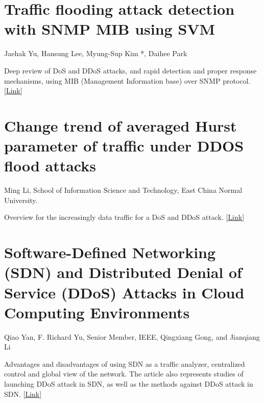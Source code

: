 \documentclass{report}
\begin{document}
\section {Traffic flooding attack detection with SNMP MIB using SVM}
 {\footnotesize  Jaehak Yu, Hansung Lee, Myung-Sup Kim *, Daihee Park}

Deep review of DoS and DDoS attacks, and rapid detection and proper response mechanisms, using MIB (Management Information base) over SNMP protocol.
[\href{http://www.sciencedirect.com/science/article/pii/S0140366408005094}{Link}]
  \hfill \break

\section {Change trend of averaged Hurst parameter of traffic under DDOS flood attacks}
 {\footnotesize Ming Li, School of Information Science and Technology, East China Normal University.}

Overview for the increasingly data traffic for a DoS and DDoS attack.
[\href{http://www.sciencedirect.com/science/article/pii/S0167404805001963}{Link}]
\hfill \break

\section{Software-Defined Networking (SDN) and Distributed Denial of Service (DDoS) Attacks in Cloud Computing Environments }
{\footnotesize Qiao Yan, F. Richard Yu, Senior Member, IEEE, Qingxiang Gong, and Jianqiang Li }

Advantages and disadvantages of using SDN as a traffic analyzer, centralized control and global view of the network. The article also represents studies of launching DDoS attack in SDN, as well as the methods against DDoS attack in SDN.
[\href{http://ieeexplore.ieee.org/abstract/document/7289347}{Link}]
\end{document}
